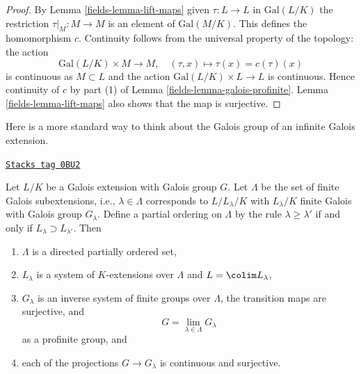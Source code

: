 \begin{proof}

By Lemma \ref{fields-lemma-lift-maps} given $\tau : L \to L$ in
$\text{Gal}(L/K)$ the restriction $\tau|_M : M \to M$
is an element of $\text{Gal}(M/K)$. This defines the homomorphism $c$.
Continuity follows from the universal property of the topology:
the action
$$
\text{Gal}(L/K) \times M \longrightarrow M,\quad
(\tau, x) \longmapsto \tau(x) = c(\tau)(x)
$$
is continuous as $M \subset L$ and the action
$\text{Gal}(L/K) \times L \to L$ is continuous.
Hence continuity of $c$ by part (1) of
Lemma \ref{fields-lemma-galois-profinite}.
Lemma \ref{fields-lemma-lift-maps} also
shows that the map is surjective.
\end{proof}

Here is a more standard way to think about
the Galois group of an infinite Galois extension.

\begin{lemma}
\label{fields-lemma-infinite-galois-limit}
\href{https://stacks.math.columbia.edu/tag/0BU2}{\texttt{Stacks tag 0BU2}}

Let $L/K$ be a Galois extension with Galois group $G$.
Let $\Lambda$ be the set of finite Galois subextensions,
i.e., $\lambda \in \Lambda$ corresponds to $L/L_\lambda/K$
with $L_\lambda/K$ finite Galois with Galois group $G_\lambda$.
Define a partial ordering on $\Lambda$ by the rule
$\lambda \geq \lambda'$ if and only if
$L_\lambda \supset L_{\lambda'}$. Then
\begin{enumerate}
\item $\Lambda$ is a directed partially ordered set,
\item $L_\lambda$ is a system of $K$-extensions over $\Lambda$
and $L = \colim L_\lambda$,
\item $G_\lambda$ is an inverse system of finite groups over $\Lambda$,
the transition maps are surjective, and
$$
G = \lim_{\lambda \in \Lambda} G_\lambda
$$
as a profinite group, and
\item each of the projections $G \to G_\lambda$ is continuous and surjective.
\end{enumerate}
\end{lemma}

